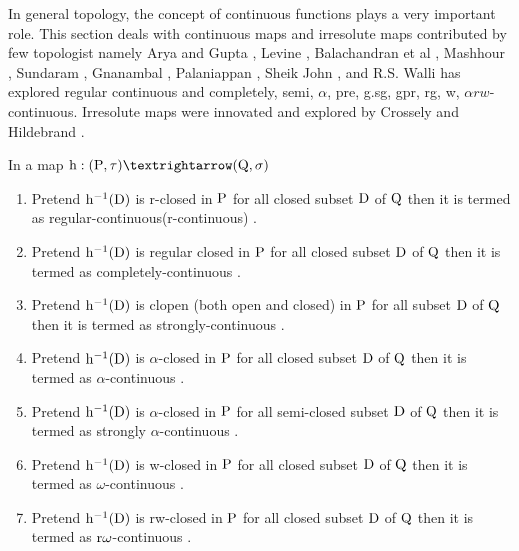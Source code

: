 In general topology, the concept of continuous functions plays a very important role. This section deals with continuous maps and irresolute maps contributed by few topologist namely Arya and Gupta \cite{Arya1},  Levine \cite{Levine1}, Balachandran et al \cite{Maki11}, Mashhour \cite{Abd1}, Sundaram \cite{Maki2},  Gnanambal \cite{Gnanambal}, Palaniappan \cite{Palaniappan}, Sheik John \cite{Sheik1}, and R.S. Walli \cite{Wali4} has explored regular continuous and completely, semi,  $\alpha$, pre, g.sg, gpr, rg, w, $\alpha rw$-continuous. Irresolute maps were innovated and explored by Crossely and Hildebrand \cite{Crossley}.

\begin{dfn}\label{dfn1.3.1}
In a map $\TSh: (\TSP, \tau) →(\TSQ, \sigma)$
\begin{enumerate}
\item Pretend $\mathrm{h}^{-1}(\mathrm{D})$ is r-closed in $\mathrm{P}$ for all closed subset $\mathrm{D}$ of $\mathrm{Q}$ then it is termed as regular-continuous(r-continuous) \cite{Arya1}. 
\item Pretend $\mathrm{h}^{-1}(\mathrm{D})$ is regular closed in $\mathrm{P}$ for all closed subset $\mathrm{D}$ of $\mathrm{Q}$ then it is termed as completely-continuous \cite{Levine2}. 
\item Pretend $\mathrm{h}^{-1}(\mathrm{D})$ is clopen (both open and closed) in $\mathrm{P}$ for all subset $\mathrm{D}$ of $\mathrm{Q}$ then it is termed as strongly-continuous \cite{Maki11}. 
\item Pretend $\mathrm{h}^{-1}(\mathrm{D})$ is $\alpha$-closed in $\mathrm{P}$ for all closed subset $\mathrm{D}$ of $\mathrm{Q}$ then it is termed as $\alpha$-continuous \cite{Maki11}. 
\item Pretend $\mathrm{h}^{-1}(\mathrm{D})$ is $\alpha$-closed in $\mathrm{P}$ for all semi-closed subset $\mathrm{D}$ of $\mathrm{Q}$ then it is termed as strongly $\alpha$-continuous \cite{Navalagi}. 
\item Pretend $\mathrm{h}^{-1}(\mathrm{D})$ is w-closed in $\mathrm{P}$ for all closed subset $\mathrm{D}$ of $\mathrm{Q}$ then it is termed as $\omega$-continuous \cite{Sheik}. 
\item Pretend $\mathrm{h}^{-1}(\mathrm{D})$ is rw-closed in $\mathrm{P}$ for all closed subset $\mathrm{D}$ of $\mathrm{Q}$ then it is termed as $\mathrm{r}\omega$-continuous \cite{Benchalli}. 
\end{enumerate}
\end{dfn}

